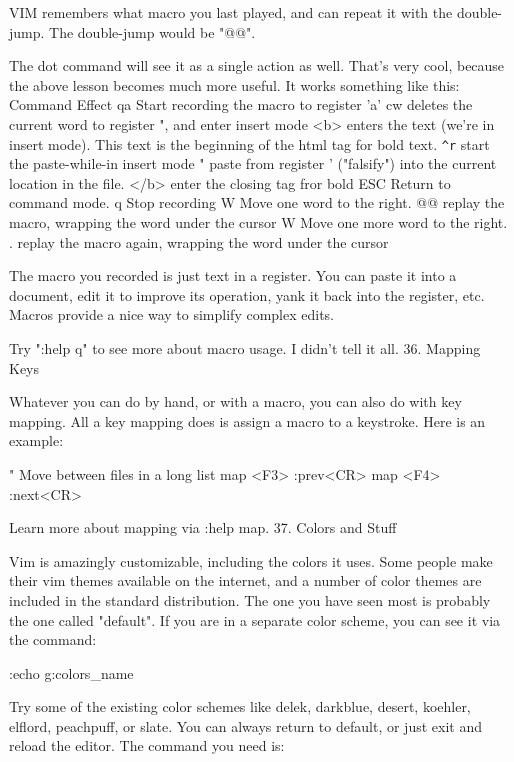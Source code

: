 \documentclass[a4paper, 12pt]{article}
\begin{document}
      VIM remembers what macro you last played, and can repeat it with the double-jump. The double-jump would be "@@".

      The dot command will see it as a single action as well. That's very cool, because the above lesson becomes much more useful. It works something like this:
      Command	Effect
      qa	Start recording the macro to register 'a'
      cw	deletes the current word to register ", and enter insert mode
      <b>	enters the text (we're in insert mode). This text is the beginning of the html tag for bold text.
      \texttt{\^{}r}	start the paste-while-in insert mode
      "	paste from register ' ("falsify") into the current location in the file.
      </b>	enter the closing tag fror bold
      ESC	Return to command mode.
      q	Stop recording
      W	Move one word to the right.
      @@	replay the macro, wrapping the word under the cursor
      W	Move one more word to the right.
      .	replay the macro again, wrapping the word under the cursor

      The macro you recorded is just text in a register. You can paste it into a document, edit it to improve its operation, yank it back into the register, etc. Macros provide a nice way to simplify complex edits.

      Try ":help q" to see more about macro usage. I didn't tell it all.
  36. Mapping Keys

      Whatever you can do by hand, or with a macro, you can also do with key mapping. All a key mapping does is assign a macro to a keystroke. Here is an example:

                  " Move between files in a long list
                  map <F3> :prev<CR>
                  map <F4> :next<CR>
              

      Learn more about mapping via :help map.
  37. Colors and Stuff

      Vim is amazingly customizable, including the colors it uses. Some people make their vim themes available on the internet, and a number of color themes are included in the standard distribution. The one you have seen most is probably the one called "default". If you are in a separate color scheme, you can see it via the command:

          :echo g:colors_name

      Try some of the existing color schemes like delek, darkblue, desert, koehler, elflord, peachpuff, or slate. You can always return to default, or just exit and reload the editor. The command you need is:
\end{document}
